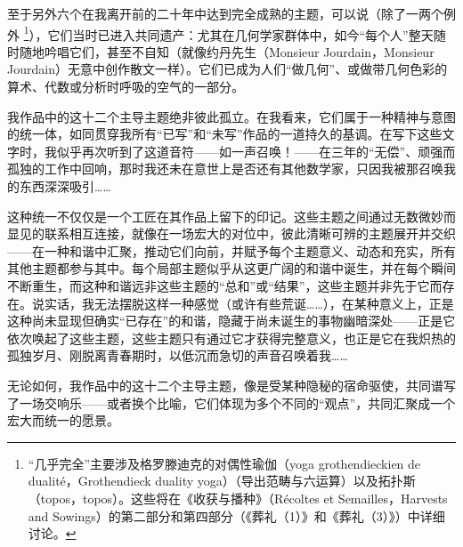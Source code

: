 至于另外六个在我离开前的二十年中达到完全成熟的主题，可以说（除了一两个例外 \footnote{“几乎完全”主要涉及格罗滕迪克的对偶性瑜伽（yoga grothendieckien de dualité，Grothendieck duality yoga）（导出范畴与六运算）以及拓扑斯（topos，topos）。这些将在《收获与播种》（Récoltes et Semailles，Harvests and Sowings）的第二部分和第四部分（《葬礼（1）》和《葬礼（3）》）中详细讨论。}），它们当时已进入共同遗产：尤其在几何学家群体中，如今“每个人”整天随时随地吟唱它们，甚至不自知（就像约丹先生（Monsieur Jourdain，Monsieur Jourdain）无意中创作散文一样）。它们已成为人们“做几何”、或做带几何色彩的算术、代数或分析时呼吸的空气的一部分。

我作品中的这十二个主导主题绝非彼此孤立。在我看来，它们属于一种精神与意图的统一体，如同贯穿我所有“已写”和“未写”作品的一道持久的基调。在写下这些文字时，我似乎再次听到了这道音符——如一声召唤！——在三年的“无偿”、顽强而孤独的工作中回响，那时我还未在意世上是否还有其他数学家，只因我被那召唤我的东西深深吸引……

这种统一不仅仅是一个工匠在其作品上留下的印记。这些主题之间通过无数微妙而显见的联系相互连接，就像在一场宏大的对位中，彼此清晰可辨的主题展开并交织——在一种和谐中汇聚，推动它们向前，并赋予每个主题意义、动态和充实，所有其他主题都参与其中。每个局部主题似乎从这更广阔的和谐中诞生，并在每个瞬间不断重生，而这种和谐远非这些主题的“总和”或“结果”，这些主题并非先于它而存在。说实话，我无法摆脱这样一种感觉（或许有些荒诞……），在某种意义上，正是这种尚未显现但确实“已存在”的和谐，隐藏于尚未诞生的事物幽暗深处——正是它依次唤起了这些主题，这些主题只有通过它才获得完整意义，也正是它在我炽热的孤独岁月、刚脱离青春期时，以低沉而急切的声音召唤着我……

无论如何，我作品中的这十二个主导主题，像是受某种隐秘的宿命驱使，共同谱写了一场交响乐——或者换个比喻，它们体现为多个不同的“观点”，共同汇聚成一个宏大而统一的愿景。


